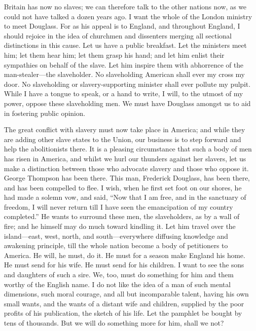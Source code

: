 Britain has now no slaves; we can therefore talk to the other nations
now, as we could not have talked a dozen years ago. I want the whole of
the London ministry to meet Douglass. For as his appeal is to England,
and throughout England, I should rejoice in the {}idea of churchmen and
dissenters merging all sectional distinctions in this cause. Let us have
a public breakfast. Let the ministers meet him; let them hear him; let
them grasp his hand; and let him enlist their sympathies on behalf of
the slave. Let him inspire them with abhorrence of the man-stealer---the
slaveholder. No slaveholding American shall ever my cross my door. No
slaveholding or slavery-supporting minister shall ever pollute my
pulpit. While I have a tongue to speak, or a hand to write, I will, to
the utmost of my power, oppose these slaveholding men. We must have
Douglass amongst us to aid in fostering public opinion.

The great conflict with slavery must now take place in America; and
while they are adding other slave states to the Union, our business is
to step forward and help the abolitionists there. It is a pleasing
circumstance that such a body of men has risen in America, and whilst we
hurl our thunders against her slavers, let us make a distinction between
those who advocate slavery and those who oppose it. George Thompson has
been there. This man, Frederick Douglass, has been there, and has been
compelled to flee. I wish, when he first set foot on our shores, he had
made a solemn vow, and said, ``Now that I am free, and in the sanctuary
of freedom, I will never return till I have seen the emancipation of my
country completed.'' He wants to surround these men, the slaveholders,
as by a wall of fire; and he himself may do much toward kindling it. Let
him travel over the island---east, west, north, and south---everywhere
diffusing knowledge and awakening principle, till the whole nation
become a body of petitioners to America. He will, he must, do it. He
must for a season make England his home. He must send for his wife. He
must send for his children. I want to see the sons and daughters of such
a sire. We, too, must do something for him and them worthy of the
English name. I do not like the idea of a man of such mental dimensions,
such moral courage, and all but incomparable talent, having his own
small wants, and the wants of a distant wife and children, supplied by
the poor profits of his publication, the sketch of his life. Let the
pamphlet be bought by tens of thousands. But we will do something more
for him, shall we not?

